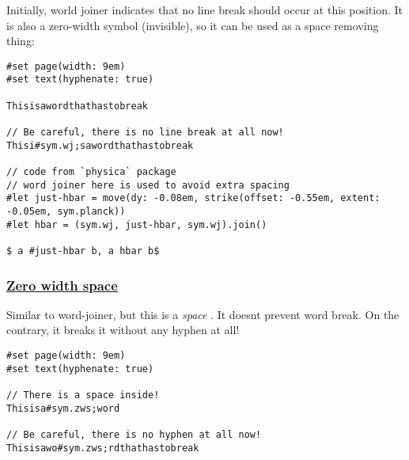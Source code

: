 Initially, world joiner indicates that no line break should occur at
this position. It is also a zero-width symbol (invisible), so it can be
used as a space removing thing:

\begin{verbatim}
#set page(width: 9em)
#set text(hyphenate: true)

Thisisawordthathastobreak

// Be careful, there is no line break at all now!
Thisi#sym.wj;sawordthathastobreak

// code from `physica` package
// word joiner here is used to avoid extra spacing
#let just-hbar = move(dy: -0.08em, strike(offset: -0.55em, extent: -0.05em, sym.planck))
#let hbar = (sym.wj, just-hbar, sym.wj).join()

$ a #just-hbar b, a hbar b$
\end{verbatim}

\pandocbounded{}

\subsubsection{\texorpdfstring{\hyperref[zero-width-space]{Zero width
space}}{Zero width space}}\label{zero-width-space}

Similar to word-joiner, but this is a \emph{space} . It
doesn\textquotesingle t prevent word break. On the contrary, it breaks
it without any hyphen at all!

\begin{verbatim}
#set page(width: 9em)
#set text(hyphenate: true)

// There is a space inside!
Thisisa#sym.zws;word

// Be careful, there is no hyphen at all now!
Thisisawo#sym.zws;rdthathastobreak
\end{verbatim}

\pandocbounded{}
